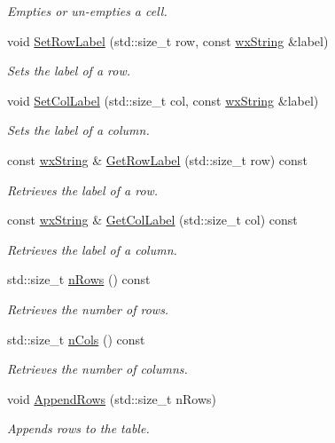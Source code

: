 \begin{DoxyCompactItemize}
\begin{DoxyCompactList}\small\item\em Empties or un-\/empties a cell. \item\end{DoxyCompactList}\item 
void \hyperlink{classstf_1_1Table_ac690107b3da37447fcf81c8415a4bbf8}{SetRowLabel} (std::size\_\-t row, const \hyperlink{classwxString}{wxString} \&label)
\begin{DoxyCompactList}\small\item\em Sets the label of a row. \item\end{DoxyCompactList}\item 
void \hyperlink{classstf_1_1Table_acfb40b394d65fc6f3d6641b15516cfbe}{SetColLabel} (std::size\_\-t col, const \hyperlink{classwxString}{wxString} \&label)
\begin{DoxyCompactList}\small\item\em Sets the label of a column. \item\end{DoxyCompactList}\item 
const \hyperlink{classwxString}{wxString} \& \hyperlink{classstf_1_1Table_ad128a17e4345ef497f2f3cb3d24b73b4}{GetRowLabel} (std::size\_\-t row) const 
\begin{DoxyCompactList}\small\item\em Retrieves the label of a row. \item\end{DoxyCompactList}\item 
const \hyperlink{classwxString}{wxString} \& \hyperlink{classstf_1_1Table_ace5d5785164b29ba377990df607b1a30}{GetColLabel} (std::size\_\-t col) const 
\begin{DoxyCompactList}\small\item\em Retrieves the label of a column. \item\end{DoxyCompactList}\item 
std::size\_\-t \hyperlink{classstf_1_1Table_ae16650b355dc58d57eb0bdf87ebf9938}{nRows} () const 
\begin{DoxyCompactList}\small\item\em Retrieves the number of rows. \item\end{DoxyCompactList}\item 
std::size\_\-t \hyperlink{classstf_1_1Table_af7560717c30f6c78a536c0246a8f8142}{nCols} () const 
\begin{DoxyCompactList}\small\item\em Retrieves the number of columns. \item\end{DoxyCompactList}\item 
void \hyperlink{classstf_1_1Table_ae7e7008c348ce5760c1d7cfee214a8a5}{AppendRows} (std::size\_\-t nRows)
\begin{DoxyCompactList}\small\item\em Appends rows to the table. \item\end{DoxyCompactList}\end{DoxyCompactItemize}


